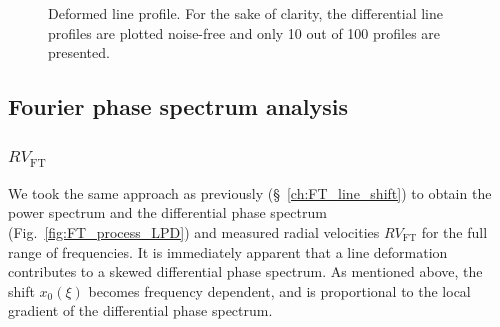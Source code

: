 \begin{figure}[tbp]
    \caption[Deformed line profile]{Deformed line profile. For the sake of clarity, the differential line profiles are plotted noise-free and only 10 out of 100 profiles are presented.}
\label{fig:line_profiles_deformation}
\end{figure}	
\FloatBarrier

\subsection{Fourier phase spectrum analysis}

\subsubsection{$RV_\text{FT}$}
We took the same approach as previously (\S~\ref{ch:FT_line_shift}) to obtain the power spectrum and the differential phase spectrum (Fig.~\ref{fig:FT_process_LPD}) and measured radial velocities $RV_\text{FT}$ for the full range of frequencies. It is immediately apparent that a line deformation contributes to a skewed differential phase spectrum. As mentioned above, the shift $x_0(\xi)$ becomes frequency dependent, and is proportional to the local gradient of the differential phase spectrum. 

